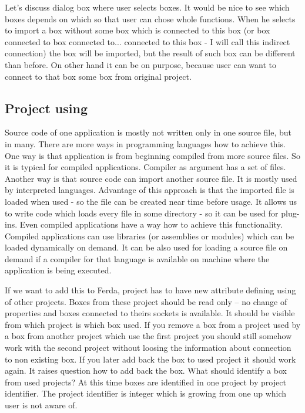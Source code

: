 \documentclass[a4paper,12pt]{book}
\begin{document}
Let's discuss dialog box where user selects boxes. It would be nice to see which boxes depends on which so that user can chose whole functions. When he selects to import a box without some box which is connected to this box (or box connected to box connected to... connected to this box - I will call this indirect connection) the box will be imported, but the result of such box can be different than before. On other hand it can be on purpose, because user can want to connect to that box some box from original project.

\subsection{Project using}
Source code of one application is mostly not written only in one source file, but in many. There are more ways in programming languages how to achieve this. One way is that application is from beginning compiled from more source files. So it is typical for compiled applications. Compiler as argument has a set of files. Another way is that source code can import another source file. It is mostly used by interpreted languages. Advantage of this approach is that the imported file is loaded when used - so the file can be created near time before usage. It allows us to write code which loads every file in some directory - so it can be used for plug-ins. Even compiled applications have a way how to achieve this functionality. Compiled applications can use libraries (or assemblies or modules) which can be loaded dynamically on demand. It can be also used for loading a source file on demand if a compiler for that language is available on machine where the application is being executed.

If we want to add this to Ferda, project has to have new attribute defining using of other projects. Boxes from these project should be read only -- no change of properties and boxes connected to theirs sockets is available. It should be visible from which project is which box used. If you remove a box from a project used by a box from another project which use the first project you should still somehow work with the second project without loosing the information about connection to non existing box. If you later add back the box to used project it should work again. It raises question how to add back the box. What should identify a box from used projects? At this time boxes are identified in one project by project identifier. The project identifier is integer which is growing from one up which user is not aware of.
\end{document}
